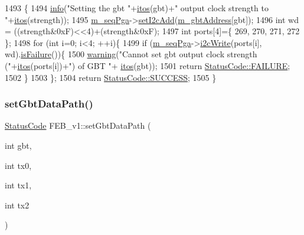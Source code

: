 \begin{DoxyCode}
1493                                                            \{
1494   \hyperlink{classObject_a644fd329ea4cb85f54fa6846484b84a8}{info}(\textcolor{stringliteral}{"Setting the gbt "}+\hyperlink{Tools_8h_af330027dbdafb9a30768b3613c553e60}{itos}(gbt)+\textcolor{stringliteral}{" output clock strength to "}+\hyperlink{Tools_8h_af330027dbdafb9a30768b3613c553e60}{itos}(strength));
1495   \hyperlink{classFEB__v1_a6c7804ac86796f233a8393043adf2e77}{m\_seqPga}->\hyperlink{classSeqPGA_a4ef334e4d2cb417b49033dce951728cd}{setI2cAdd}(\hyperlink{classFEB__v1_ac625855df976f16694178f1a4c0eef1e}{m\_gbtAddress}[gbt]);
1496   \textcolor{keywordtype}{int} wd = ((strength&0xF)<<4)+(strength&0xF);
1497   \textcolor{keywordtype}{int} ports[4]=\{ 269, 270, 271, 272 \};
1498   \textcolor{keywordflow}{for} (\textcolor{keywordtype}{int} i=0; i<4; ++i)\{
1499     \textcolor{keywordflow}{if} (\hyperlink{classFEB__v1_a6c7804ac86796f233a8393043adf2e77}{m\_seqPga}->\hyperlink{classSeqPGA_a429076ca3a4ece94182bd95c623bb9d0}{i2cWrite}(ports[i], wd).\hyperlink{classStatusCode_a5dd22dc6eb2c52fc4cabc58f6dea2eb7}{isFailure}())\{
1500       \hyperlink{classObject_a65cd4fda577711660821fd2cd5a3b4c9}{warning}(\textcolor{stringliteral}{"Cannot set gbt output clock strength ("}+\hyperlink{Tools_8h_af330027dbdafb9a30768b3613c553e60}{itos}(ports[i])+\textcolor{stringliteral}{") of GBT "}+
      \hyperlink{Tools_8h_af330027dbdafb9a30768b3613c553e60}{itos}(gbt));
1501       \textcolor{keywordflow}{return} \hyperlink{classStatusCode_a6f565cbeadc76d14c72f047e5e85eb4ba3da73d4c469762eb9d3c960368252b26}{StatusCode::FAILURE};
1502     \}
1503   \};
1504   \textcolor{keywordflow}{return} \hyperlink{classStatusCode_a6f565cbeadc76d14c72f047e5e85eb4badd0da38d3ba0d922efd1f4619bc37ad8}{StatusCode::SUCCESS};
1505 \}
\end{DoxyCode}
\mbox{\label{classFEB__v1_aabd651b11d1119ce3a19b7fb083cca78}} 
\subsubsection{\texorpdfstring{set\+Gbt\+Data\+Path()}{setGbtDataPath()}}
{\footnotesize\ttfamily \hyperlink{classStatusCode}{Status\+Code} F\+E\+B\+\_\+v1\+::set\+Gbt\+Data\+Path (\begin{DoxyParamCaption}\item[{int}]{gbt,  }\item[{int}]{tx0,  }\item[{int}]{tx1,  }\item[{int}]{tx2 }\end{DoxyParamCaption})}




